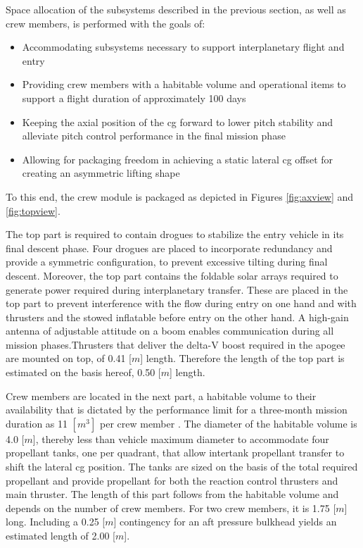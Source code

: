 Space allocation of the subsystems described in the previous section, as well as crew members, is performed with the goals of:
\begin{itemize}
\item Accommodating subsystems necessary to support interplanetary flight and entry
\item Providing crew members with a habitable volume and operational items to support a flight duration of approximately 100 days
\item Keeping the axial position of the \gls{cg} forward to lower pitch stability and alleviate pitch control performance in the final mission phase
\item Allowing for packaging freedom in achieving a static lateral \gls{cg} offset for creating an asymmetric lifting shape
\end{itemize}
To this end, the crew module is packaged as depicted in Figures \ref{fig:axview} and \ref{fig:topview}. 

The top part is required to contain drogues to stabilize the entry vehicle in its final descent phase. Four drogues are placed to incorporate redundancy and provide
a symmetric configuration, to prevent excessive tilting during final descent. Moreover, the top part contains the foldable solar arrays required to generate power required during interplanetary transfer. These are placed in the top part to prevent interference with the flow during entry on one hand and with thrusters and the stowed inflatable before entry on the other hand. A high-gain antenna of adjustable attitude on a boom enables communication during all mission phases.Thrusters that deliver the delta-V boost required in the apogee are mounted on top, of 0.41 [$m$] length. Therefore the length of the top part is estimated on the basis hereof, 0.50 [$m$] length.

Crew members are located in the next part, a habitable volume to their availability that is dictated by the performance limit for a three-month mission duration as 11 $[m^{3}]$ per crew member \cite{Rudisill2008}. The diameter of the habitable volume is 4.0 [$m$], thereby less than vehicle maximum diameter to accommodate four propellant tanks, one per quadrant, that allow intertank propellant transfer to shift the lateral \gls{cg} position. The tanks are sized on the basis of the total required propellant and provide propellant for both the reaction control thrusters and main thruster. The length of this part follows from the habitable volume and depends on the number of crew members. For two crew members, it is 1.75 [$m$] long. Including a 0.25 [$m$] contingency for an aft pressure bulkhead yields an estimated length of 2.00 [$m$].

